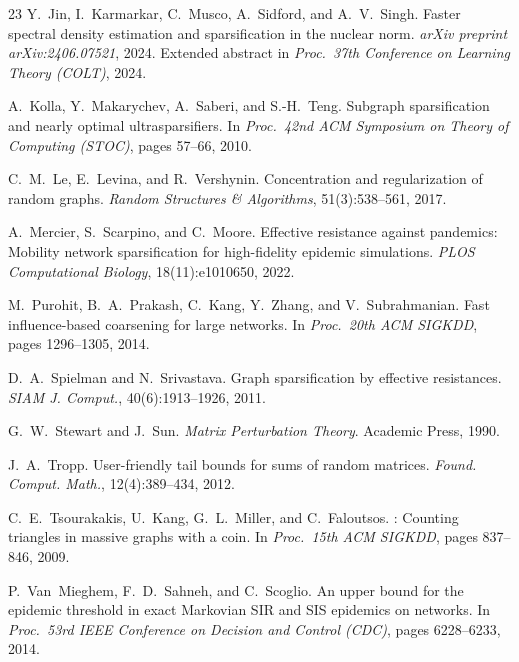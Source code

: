 \documentclass[11pt]{article}
\theoremstyle{definition}
\begin{document}
\begin{thebibliography}{23}
Y.~Jin, I.~Karmarkar, C.~Musco, A.~Sidford, and A.~V.~Singh.
\newblock Faster spectral density estimation and sparsification in the nuclear norm.
\newblock \emph{arXiv preprint arXiv:2406.07521}, 2024.
\newblock Extended abstract in \emph{Proc.\ 37th Conference on Learning Theory (COLT)}, 2024.

A.~Kolla, Y.~Makarychev, A.~Saberi, and S.-H.~Teng.
\newblock Subgraph sparsification and nearly optimal ultrasparsifiers.
\newblock In \emph{Proc.\ 42nd ACM Symposium on Theory of Computing (STOC)},
pages 57--66, 2010.

C.~M.~Le, E.~Levina, and R.~Vershynin.
\newblock Concentration and regularization of random graphs.
\newblock \emph{Random Structures \& Algorithms}, 51(3):538--561, 2017.

A.~Mercier, S.~Scarpino, and C.~Moore.
\newblock Effective resistance against pandemics: Mobility network sparsification for
high-fidelity epidemic simulations.
\newblock \emph{PLOS Computational Biology}, 18(11):e1010650, 2022.

M.~Purohit, B.~A.~Prakash, C.~Kang, Y.~Zhang, and V.~Subrahmanian.
\newblock Fast influence-based coarsening for large networks.
\newblock In \emph{Proc.\ 20th ACM SIGKDD}, pages 1296--1305, 2014.

D.~A.~Spielman and N.~Srivastava.
\newblock Graph sparsification by effective resistances.
\newblock \emph{SIAM J. Comput.}, 40(6):1913--1926, 2011.

G.~W.~Stewart and J.~Sun.
\newblock \emph{Matrix Perturbation Theory}.
\newblock Academic Press, 1990.

J.~A.~Tropp.
\newblock User-friendly tail bounds for sums of random matrices.
\newblock \emph{Found. Comput. Math.}, 12(4):389--434, 2012.

C.~E.~Tsourakakis, U.~Kang, G.~L.~Miller, and C.~Faloutsos.
: Counting triangles in massive graphs with a coin.
\newblock In \emph{Proc.\ 15th ACM SIGKDD}, pages 837--846, 2009.

P.~Van~Mieghem, F.~D.~Sahneh, and C.~Scoglio.
\newblock An upper bound for the epidemic threshold in exact {M}arkovian {SIR}
and {SIS} epidemics on networks.
\newblock In \emph{Proc.\ 53rd IEEE Conference on Decision and Control (CDC)},
pages 6228--6233, 2014.


\end{thebibliography}
\end{document}
